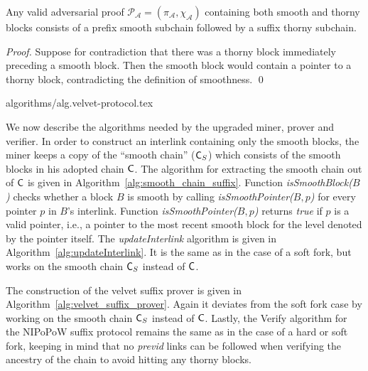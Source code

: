 \begin{lemma}
	Any valid adversarial proof $\mathcal{P_A} = (\pi_\mathcal{A}, \chi_\mathcal{A})$ containing both smooth and thorny blocks consists of a prefix smooth subchain followed by a suffix thorny subchain.
	\label{lem:adversarial_proof_scheme}
\end{lemma}
\begin{proof}
	Suppose for contradiction that there was a thorny block immediately preceding a smooth block. Then the smooth block would contain a pointer to a thorny block, contradicting the definition of smoothness.
	\qed
\end{proof}

{algorithms/alg.velvet-protocol.tex}

We now describe the algorithms needed by the upgraded miner, prover and verifier. In order to construct an interlink containing only the smooth blocks, the miner keeps a copy of the ``smooth chain'' ($\mathsf{C}_S$) which consists of the smooth blocks in his adopted chain $\mathsf{C}$. The algorithm for extracting the smooth chain out of $\mathsf{C}$ is given in Algorithm~\ref{alg:smooth_chain_suffix}. Function \emph{isSmoothBlock($B$)} checks whether a block $B$ is smooth by calling \textit{isSmoothPointer($B,p$)} for every pointer $p$ in $B$'s interlink. Function \emph{isSmoothPointer($B,p$)} returns \emph{true} if $p$ is a valid pointer, i.e., a pointer to the most recent smooth block for the level denoted by the pointer itself. The \emph{updateInterlink} algorithm is given in Algorithm~\ref{alg:updateInterlink}. It is the same as in the case of a soft fork, but works on the smooth chain $\mathsf{C}_S$ instead of $\mathsf{C}$.

The construction of the velvet suffix prover is given in Algorithm~\ref{alg:velvet_suffix_prover}. Again it deviates from the soft fork case by working on the smooth chain $\mathsf{C}_S$ instead of $\mathsf{C}$.
Lastly, the Verify algorithm for the NIPoPoW suffix protocol remains the same as in the case of a hard or soft fork, keeping in mind that no \emph{previd} links can be followed when verifying the ancestry of the chain to avoid hitting any thorny blocks.

